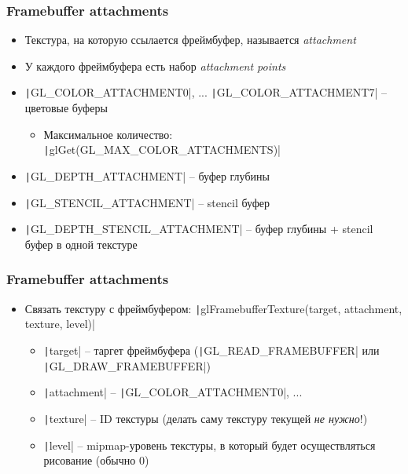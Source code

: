 \documentclass[10pt]{beamer}
\begin{document}
\begin{frame}[fragile]
\frametitle{Framebuffer attachments}
\begin{itemize}
\item Текстура, на которую ссылается фреймбуфер, называется \textit{attachment}
\pause
\item У каждого фреймбуфера есть набор \textit{attachment points}
\pause
\item \texttt|GL_COLOR_ATTACHMENT0|, ... \texttt|GL_COLOR_ATTACHMENT7| -- цветовые буферы
\pause
\begin{itemize}
\item Максимальное количество: \texttt|glGet(GL_MAX_COLOR_ATTACHMENTS)|
\end{itemize}
\pause
\item \texttt|GL_DEPTH_ATTACHMENT| -- буфер глубины
\item \texttt|GL_STENCIL_ATTACHMENT| -- stencil буфер
\item \texttt|GL_DEPTH_STENCIL_ATTACHMENT| -- буфер глубины + stencil буфер в одной текстуре
\end{itemize}
\end{frame}

\begin{frame}[fragile]
\frametitle{Framebuffer attachments}
\begin{itemize}
\item Связать текстуру с фреймбуфером: \texttt|glFramebufferTexture(target, attachment, texture, level)|
\pause
\begin{itemize}
\item \texttt|target| -- таргет фреймбуфера (\texttt|GL_READ_FRAMEBUFFER| или \texttt|GL_DRAW_FRAMEBUFFER|)
\pause
\item \texttt|attachment| -- \texttt|GL_COLOR_ATTACHMENT0|, ...
\pause
\item \texttt|texture| -- ID текстуры (делать саму текстуру текущей \textit{не нужно}!)
\pause
\item \texttt|level| -- mipmap-уровень текстуры, в который будет осуществляться рисование (обычно 0)
\end{itemize}
\end{itemize}
\end{frame}
\end{document}
